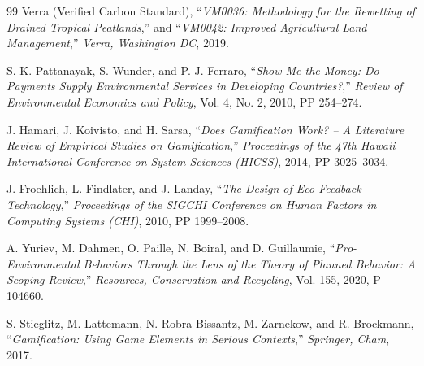 \documentclass[a4paper,12pt,oneside]{report}
\begin{document}
\begin{thebibliography}{99}
     Verra (Verified Carbon Standard), ``\textit{VM0036: Methodology for the Rewetting of Drained Tropical Peatlands},'' and ``\textit{VM0042: Improved Agricultural Land Management},'' \textit{Verra, Washington DC}, 2019.

     S. K. Pattanayak, S. Wunder, and P. J. Ferraro, ``\textit{Show Me the Money: Do Payments Supply Environmental Services in Developing Countries?},'' \textit{Review of Environmental Economics and Policy}, Vol. 4, No. 2, 2010, PP 254--274.

     J. Hamari, J. Koivisto, and H. Sarsa, ``\textit{Does Gamification Work? -- A Literature Review of Empirical Studies on Gamification},'' \textit{Proceedings of the 47th Hawaii International Conference on System Sciences (HICSS)}, 2014, PP 3025--3034.

     J. Froehlich, L. Findlater, and J. Landay, ``\textit{The Design of Eco-Feedback Technology},'' \textit{Proceedings of the SIGCHI Conference on Human Factors in Computing Systems (CHI)}, 2010, PP 1999--2008.

     A. Yuriev, M. Dahmen, O. Paille, N. Boiral, and D. Guillaumie, ``\textit{Pro-Environmental Behaviors Through the Lens of the Theory of Planned Behavior: A Scoping Review},'' \textit{Resources, Conservation and Recycling}, Vol. 155, 2020, P 104660.

     S. Stieglitz, M. Lattemann, N. Robra-Bissantz, M. Zarnekow, and R. Brockmann, ``\textit{Gamification: Using Game Elements in Serious Contexts},'' \textit{Springer, Cham}, 2017.
\end{thebibliography}
\end{document}
